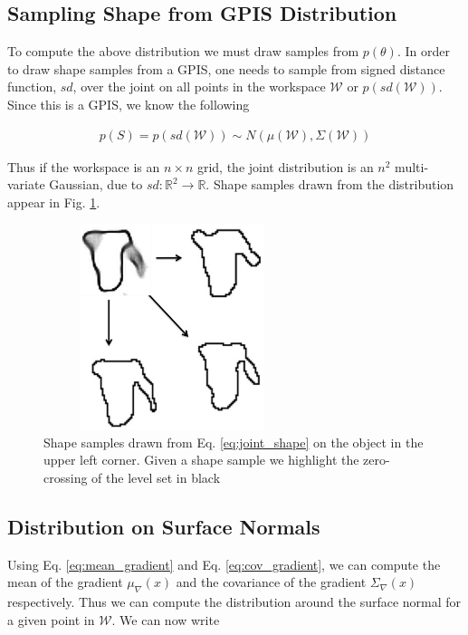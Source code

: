 \documentclass[journal,transmag]{IEEEtran}%
\begin{document}
\subsection{Sampling Shape from GPIS Distribution }
To compute the above distribution we must draw samples from $p(\theta)$. In order to draw shape samples from a GPIS, one needs to sample from signed distance function, $sd$, over the joint on all points in the workspace $\mathcal{W}$ or $p(sd(\mathcal{W}))$. Since this is a GPIS, we know the following 

\vspace{-2ex}
\begin{align}\label{eq:joint_shape}
p(S) = p(sd(\mathcal{W})) \sim N(\mu(\mathcal{W}),\Sigma(\mathcal{W}))
\end{align}

Thus if the workspace is an $n \times n$ grid, the joint distribution is an  $n^2$ multi-variate Gaussian, due to $sd:\mathbb{R}^2 \rightarrow \mathbb{R}$.  Shape samples drawn from the distribution appear in Fig. \ref{fig:shape_samples}.


\begin{figure}[ht!]
\centering
\includegraphics[width = 7.5cm, height= 6cm ]{figures/Slide13.jpg}
\caption{Shape samples drawn from Eq. \ref{eq:joint_shape} on the object in the upper left corner. Given a shape sample we highlight the zero-crossing of the level set in black}
\vspace*{-10pt}
\label{fig:shape_samples}
\end{figure}

\subsection{Distribution on Surface Normals}\label{sec:normals} 
Using Eq. \ref{eq:mean_gradient} and Eq. \ref{eq:cov_gradient}, we can compute the mean of the gradient $ \mu_{\nabla}(x)$ and the covariance of the gradient $\Sigma_{\nabla}(x)$ respectively. Thus we can compute the distribution around the surface normal for a given point in $\mathcal{W}$. We can now write 
\end{document}
